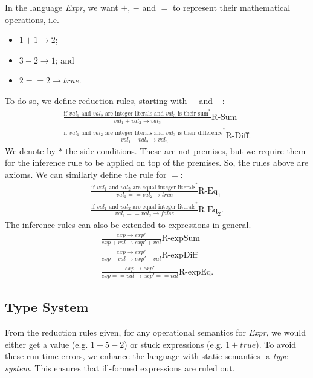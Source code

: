 \documentclass[a4paper, openany]{memoir}
\begin{document}
    In the language \textit{Expr}, we want $+$, $-$ and $=$ to represent their mathematical operations, i.e. 
    \begin{itemize}
        \item $1 + 1 \to 2$;
        \item $3 - 2 \to 1$; and
        \item $2 == 2 \to \textit{true}$. 
    \end{itemize}
    To do so, we define reduction rules, starting with $+$ and $-$:
    \begin{align*}
        \frac{\textrm{if } val_1 \textrm{ and } val_2 \textrm{ are integer literals and } val_3 \textrm{ is their sum}^*}{val_1 + val_2 \to val_3} \textrm{R-Sum} \\
        \frac{\textrm{if } val_1 \textrm{ and } val_2 \textrm{ are integer literals and } val_3 \textrm{ is their difference}^*}{val_1 - val_2 \to val_3} \textrm{R-Diff}.
    \end{align*}
    We denote by $*$ the side-conditions. These are not premises, but we require them for the inference rule to be applied on top of the premises. So, the rules above are axioms. We can similarly define the rule for $=$:
    \begin{align*}
        \frac{\textrm{if } val_1 \textrm{ and } val_2 \textrm{ are equal integer literals}^*}{val_1 == val_2 \to \textit{true}} \textrm{R-Eq}_1 \\
        \frac{\textrm{if } val_1 \textrm{ and } val_2 \textrm{ are equal integer literals}^*}{val_1 == val_2 \to \textit{false}} \textrm{R-Eq}_2.
    \end{align*}
    The inference rules can also be extended to expressions in general.
    \begin{align*}
        \frac{exp \to exp'}{exp + val \to exp' + val} \textrm{R-expSum} \\
        \frac{exp \to exp'}{exp - val \to exp' - val} \textrm{R-expDiff} \\
        \frac{exp \to exp'}{exp == val \to exp' == val} \textrm{R-expEq}.
    \end{align*}

    \subsection{Type System}
    From the reduction rules given, for any operational semantics for \textit{Expr}, we would either get a value (e.g. $1 + 5 - 2$) or stuck expressions (e.g. $1 + \textit{true}$). To avoid these run-time errors, we enhance the language with static semantics- a \emph{type system}. This ensures that ill-formed expressions are ruled out.
\end{document}
